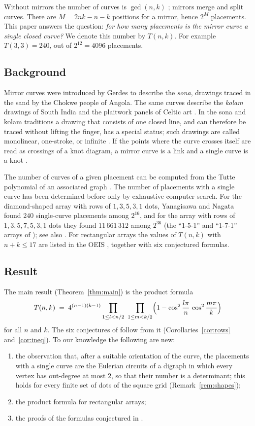 \documentclass[11pt,a4paper]{amsart}
\theoremstyle{remark}
\begin{document}
Without mirrors the number of curves is $\gcd(n,k)$ \cite{FM,Gerdes,JRSZ}; mirrors merge and split curves. There
are $M=2nk-n-k$ positions for a mirror, hence $2^{M}$ placements. This paper answers the question:
\emph{for how many placements is the mirror curve a single closed curve?} We denote this number by $T(n,k)$. For
example $T(3,3)=240$, out of $2^{12}=4096$ placements.

\subsection{Background}
Mirror curves were introduced by Gerdes \cite{Gerdes} to describe the \emph{sona}, drawings traced in the sand by
the Chokwe people of Angola. The same curves describe the \emph{kolam} drawings of South India
\cite{Ishimoto,Nagata,YN} and the plaitwork panels of Celtic art \cite{FM,JRSZ}. In the sona and kolam traditions a drawing that consists of one closed line, and can therefore be
traced without lifting the finger, has a special status; such drawings are called monolinear, one-stroke, or
infinite \cite{Gerdes,Ishimoto,YN}. If the points where the curve crosses itself are read as crossings of a knot
diagram, a mirror curve is a link and a single curve is a knot \cite{JRSZ}.

The number of curves of a given placement can be computed from the Tutte polynomial of an associated graph
\cite{Nagata}. The number of placements with a single curve has been determined before only by exhaustive computer
search. For the diamond-shaped array with rows of $1,3,5,3,1$ dots, Yanagisawa and Nagata \cite{YN} found $240$
single-curve placements among $2^{16}$, and for the array with rows of $1,3,5,7,5,3,1$ dots they found
$11\,661\,312$ among $2^{36}$ (the ``1-5-1'' and ``1-7-1'' arrays of \cite{YN}); see also \cite{Ishimoto}. For rectangular arrays the values of $T(n,k)$ with
$n+k\le 17$ are listed in the OEIS \cite{OEIS}, together with six conjectured formulas.

\subsection{Result}
The main result (Theorem~\ref{thm:main}) is the product formula
\[
T(n,k)\;=\;4^{(n-1)(k-1)}\prod_{1\le l<n/2}\ \prod_{1\le m<k/2}\Bigl(1-\cos^2\frac{l\pi}{n}\,\cos^2\frac{m\pi}{k}\Bigr)
\]
for all $n$ and $k$. The six conjectures of \cite{OEIS} follow from it
(Corollaries~\ref{cor:rows} and~\ref{cor:ineq}). To our knowledge the following are new:
\begin{enumerate}
\item[(i)] the observation that, after a suitable orientation of the curve, the placements with a single curve are
the Eulerian circuits of a digraph in which every vertex has out-degree at most $2$, so that their number is a
determinant; this holds for every finite set of dots of the square grid (Remark~\ref{rem:shapes});
\item[(ii)] the product formula for rectangular arrays;
\item[(iii)] the proofs of the formulas conjectured in \cite{OEIS}.
\end{enumerate}
\end{document}
